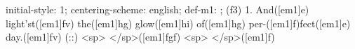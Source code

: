 initial-style: 1;
centering-scheme: english;
def-m1: \grealign;
(f3) 1. And([em1]e) light'st([em1]fv) the([em1]hg) glow([em1]hi) of([em1]hg) per-([em1]f)fect([em1]e) day.([em1]fv) (::) <sp> </sp>([em1]fgf) <sp> </sp>([em1]f)